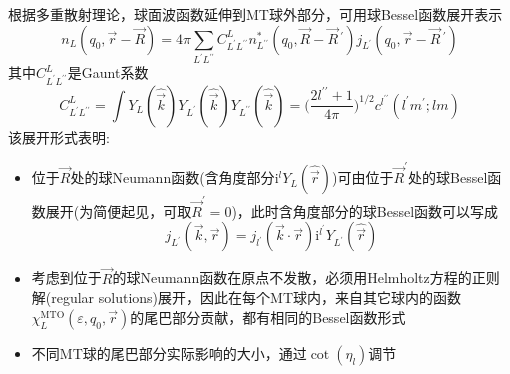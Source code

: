 {		根据多重散射理论，球面波函数延伸到\textrm{MT}球外部分，可用球\textrm{Bessel}函数展开表示
		\begin{displaymath}
			n_L(q_0,\vec r-\vec R)=4\pi\sum_{L^{\prime}L^{\prime\prime}}C_{L^{\prime}L^{\prime\prime}}^Ln_{L^{\prime\prime}}^{\ast}(q_0,\vec R-\vec R\,^{\prime})j_{L^{\prime}}(q_0,\vec r-\vec R\,^{\prime})
		\end{displaymath}
		其中$C_{L^{\prime}L^{\prime\prime}}^L$是\textrm{Gaunt}系数
		\begin{displaymath}
			C_{L^{\prime}L^{\prime\prime}}^L=\int Y_L(\hat{\vec k})Y_{L^{\prime}}(\hat{\vec k})Y_{L^{\prime\prime}}(\hat{\vec k})=\bigg(\dfrac{2l^{\prime\prime}+1}{4\pi}\bigg)^{1/2}c^{l^{\prime\prime}}(l^{\prime}m^{\prime};lm)
		\end{displaymath}
		该展开形式表明:
		\begin{itemize}
			\item 位于$\vec R$处的球\textrm{Neumann}函数(含角度部分$\mathrm{i}^lY_L(\hat{\vec r})$)可由位于$\vec R^{\prime}$处的球\textrm{Bessel}函数展开(为简便起见，可取$\vec R^{\prime}=0$)，此时含角度部分的球\textrm{Bessel}函数可以写成
				\begin{displaymath}
					j_{L^{\prime}}(\vec k,\vec r)=j_{l^{\prime}}(\vec k\cdot\vec r)\mathrm{i}^{l^{\prime}}Y_{L^{\prime}}(\hat{\vec r})
				\end{displaymath}
			\item 考虑到位于$\vec R$的球\textrm{Neumann}函数在原点不发散，必须用\textrm{Helmholtz}方程的正则解\textrm{(regular solutions)}展开，因此在每个\textrm{MT}球内，来自其它球内的函数$\chi_L^{\mathrm{MTO}}(\varepsilon,q_0,\vec r)$的尾巴部分贡献，都有相同的\textrm{Bessel}函数形式
		\item 不同\textrm{MT}球的尾巴部分实际影响的大小，通过$\cot(\eta_l)$调节
		\end{itemize}

}

